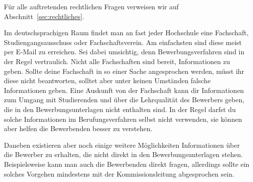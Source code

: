 Für alle auftretenden rechtlichen Fragen verweisen wir auf Abschnitt~\ref{sec:rechtliches}.

Im deutschsprachigen Raum findet man an fast jeder Hochschule eine Fachschaft, Studiengangsausschuss oder Fachschaftsverein. 
Am einfachsten sind diese meist per E-Mail zu erreichen. 
Sei dabei umsichtig, denn Bewerbungsverfahren sind in der Regel vertraulich.
Nicht alle Fachschaften sind bereit, Informationen zu geben.
Sollte deine Fachschaft in so einer Sache angesprochen werden, müsst ihr diese nicht beantworten, solltet aber unter keinen Umständen falsche Informationen geben.
Eine Auskunft von der Fachschaft kann dir Informationen zum Umgang mit Studierenden und über die Lehrqualität des Bewerbers geben, die in den Bewerbungsunterlagen nicht enthalten sind.
In der Regel darfst du solche Informationen im Berufungsverfahren selbst nicht verwenden, sie können aber helfen die Bewerbenden besser zu verstehen.

Daneben existieren aber noch einige weitere Möglichkeiten Informationen über die Bewerber zu erhalten, die nicht direkt in den Bewerbungsunterlagen stehen.
Beispielsweise kann man auch die Bewerbenden direkt fragen, allerdings sollte ein solches Vorgehen mindestens mit der Kommissionsleitung abgesprochen sein.


